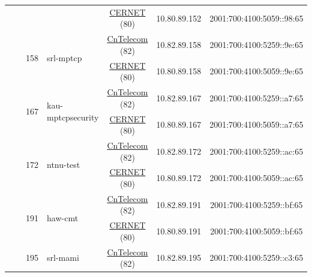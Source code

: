 \begin{small}
\begin{center}
\begin{longtable}{|c|c|c|c|c|c|c|c|}
  &  &  &  & \multicolumn{2}{|c|}{\tiny{\href{http://www.cernet.edu.cn}{CERNET} (80)}} & \tiny{10.80.89.152} & \tiny{2001:700:4100:5059::98:65} \\* \cline{3-3}\cline{4-4}\cline{5-5}\cline{6-6}\cline{7-7}\cline{8-8}
  &  & \multirow{2}{*}{\tiny{158}} & \multicolumn{1}{|l|}{\multirow{2}{*}{\tiny{srl-mptcp}}} & \multicolumn{2}{|c|}{\tiny{\href{http://www.chinatelecom.com.cn}{CnTelecom} (82)}} & \tiny{10.82.89.158} & \tiny{2001:700:4100:5259::9e:65} \\* \cline{5-5}\cline{6-6}\cline{7-7}\cline{8-8}
  &  &  &  & \multicolumn{2}{|c|}{\tiny{\href{http://www.cernet.edu.cn}{CERNET} (80)}} & \tiny{10.80.89.158} & \tiny{2001:700:4100:5059::9e:65} \\* \cline{3-3}\cline{4-4}\cline{5-5}\cline{6-6}\cline{7-7}\cline{8-8}
  &  & \multirow{2}{*}{\tiny{167}} & \multicolumn{1}{|l|}{\multirow{2}{*}{\tiny{kau-mptcpsecurity}}} & \multicolumn{2}{|c|}{\tiny{\href{http://www.chinatelecom.com.cn}{CnTelecom} (82)}} & \tiny{10.82.89.167} & \tiny{2001:700:4100:5259::a7:65} \\* \cline{5-5}\cline{6-6}\cline{7-7}\cline{8-8}
  &  &  &  & \multicolumn{2}{|c|}{\tiny{\href{http://www.cernet.edu.cn}{CERNET} (80)}} & \tiny{10.80.89.167} & \tiny{2001:700:4100:5059::a7:65} \\* \cline{3-3}\cline{4-4}\cline{5-5}\cline{6-6}\cline{7-7}\cline{8-8}
  &  & \multirow{2}{*}{\tiny{172}} & \multicolumn{1}{|l|}{\multirow{2}{*}{\tiny{ntnu-test}}} & \multicolumn{2}{|c|}{\tiny{\href{http://www.chinatelecom.com.cn}{CnTelecom} (82)}} & \tiny{10.82.89.172} & \tiny{2001:700:4100:5259::ac:65} \\* \cline{5-5}\cline{6-6}\cline{7-7}\cline{8-8}
  &  &  &  & \multicolumn{2}{|c|}{\tiny{\href{http://www.cernet.edu.cn}{CERNET} (80)}} & \tiny{10.80.89.172} & \tiny{2001:700:4100:5059::ac:65} \\* \cline{3-3}\cline{4-4}\cline{5-5}\cline{6-6}\cline{7-7}\cline{8-8}
  &  & \multirow{2}{*}{\tiny{191}} & \multicolumn{1}{|l|}{\multirow{2}{*}{\tiny{haw-cmt}}} & \multicolumn{2}{|c|}{\tiny{\href{http://www.chinatelecom.com.cn}{CnTelecom} (82)}} & \tiny{10.82.89.191} & \tiny{2001:700:4100:5259::bf:65} \\* \cline{5-5}\cline{6-6}\cline{7-7}\cline{8-8}
  &  &  &  & \multicolumn{2}{|c|}{\tiny{\href{http://www.cernet.edu.cn}{CERNET} (80)}} & \tiny{10.80.89.191} & \tiny{2001:700:4100:5059::bf:65} \\* \cline{3-3}\cline{4-4}\cline{5-5}\cline{6-6}\cline{7-7}\cline{8-8}
  &  & \multirow{2}{*}{\tiny{195}} & \multicolumn{1}{|l|}{\multirow{2}{*}{\tiny{srl-mami}}} & \multicolumn{2}{|c|}{\tiny{\href{http://www.chinatelecom.com.cn}{CnTelecom} (82)}} & \tiny{10.82.89.195} & \tiny{2001:700:4100:5259::c3:65} \\* \cline{5-5}\cline{6-6}\cline{7-7}\cline{8-8}

\end{longtable}
\end{center}
\end{small}
